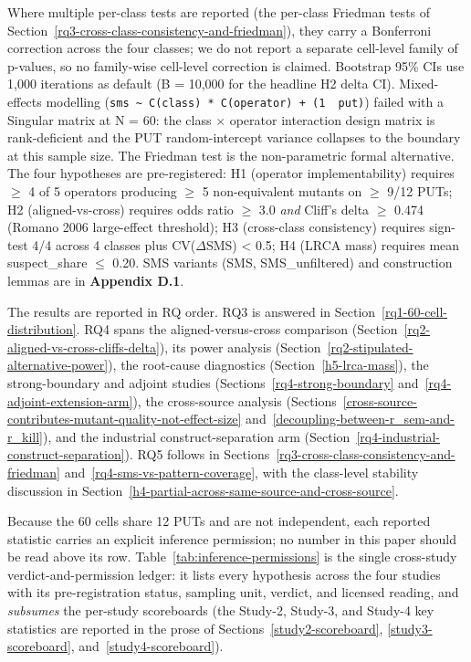 \documentclass[manuscript,screen,review]{acmart}
\begin{document}
Where multiple per-class tests are reported (the per-class Friedman tests
of Section~\ref{rq3-cross-class-consistency-and-friedman}), they carry a Bonferroni correction across the four classes; we
do not report a separate cell-level family of p-values, so no family-wise
cell-level correction is claimed. Bootstrap 95\% CIs use 1,000 iterations
as default (B = 10,000 for the headline H2 delta CI). Mixed-effects
modelling
(\texttt{sms\ \textasciitilde{}\ C(class)\ *\ C(operator)\ +\ (1\ \textbar{}\ put)})
failed with a Singular matrix at N = 60: the class $\times$ operator
interaction design matrix is rank-deficient and the PUT random-intercept
variance collapses to the boundary at this sample size. The Friedman test
is the non-parametric formal alternative. The four hypotheses are
pre-registered: H1 (operator implementability) requires $\geq$ 4 of 5
operators producing $\geq$ 5 non-equivalent mutants on $\geq$ 9/12 PUTs; H2
(aligned-vs-cross) requires odds ratio $\geq$ 3.0 \emph{and} Cliff's delta $\geq$
0.474 (Romano 2006 large-effect threshold); H3 (cross-class consistency)
requires sign-test 4/4 across 4 classes plus CV($\Delta$SMS) \textless{} 0.5;
H4 (LRCA mass) requires mean suspect\_share $\leq$ 0.20. SMS variants
(SMS, SMS\_unfiltered) and construction lemmas are in
\textbf{Appendix D.1}.

The results are reported in RQ order. RQ3 is answered in
Section~\ref{rq1-60-cell-distribution}. RQ4 spans the aligned-versus-cross
comparison (Section~\ref{rq2-aligned-vs-cross-cliffs-delta}), its power
analysis (Section~\ref{rq2-stipulated-alternative-power}), the root-cause
diagnostics (Section~\ref{h5-lrca-mass}), the strong-boundary and adjoint
studies (Sections~\ref{rq4-strong-boundary} and~\ref{rq4-adjoint-extension-arm}),
the cross-source analysis
(Sections~\ref{cross-source-contributes-mutant-quality-not-effect-size}
and~\ref{decoupling-between-r_sem-and-r_kill}), and the industrial
construct-separation arm
(Section~\ref{rq4-industrial-construct-separation}). RQ5 follows in
Sections~\ref{rq3-cross-class-consistency-and-friedman}
and~\ref{rq4-sms-vs-pattern-coverage}, with the class-level stability
discussion in Section~\ref{h4-partial-across-same-source-and-cross-source}.

Because the 60 cells share 12 PUTs and are not independent, each reported
statistic carries an explicit inference permission; no number in this paper
should be read above its row. Table~\ref{tab:inference-permissions} is the
single cross-study verdict-and-permission ledger: it lists every hypothesis
across the four studies with its pre-registration status, sampling unit,
verdict, and licensed reading, and \emph{subsumes} the per-study scoreboards
(the Study-2, Study-3, and Study-4 key statistics are reported in the prose of
Sections~\ref{study2-scoreboard}, \ref{study3-scoreboard},
and~\ref{study4-scoreboard}).
\end{document}
